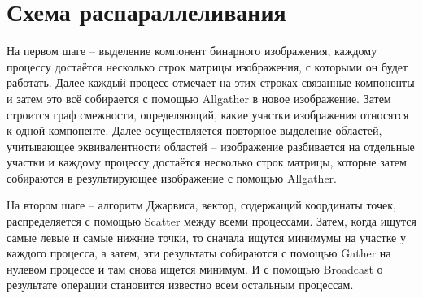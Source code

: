 \documentclass{report}
\begin{document}
\section*{Схема распараллеливания}
На первом шаге – выделение компонент бинарного изображения, каждому процессу достаётся несколько строк матрицы изображения, с которыми он будет работать. Далее каждый процесс отмечает на этих строках связанные компоненты и затем это всё собирается с помощью Allgather в новое изображение. Затем строится граф смежности, определяющий, какие участки изображения относятся к одной компоненте. Далее осуществляется повторное выделение областей, учитывающее эквивалентности областей – изображение разбивается на отдельные участки и каждому процессу достаётся несколько строк матрицы, которые затем собираются в результирующее изображение с помощью Allgather.
\par
На втором шаге – алгоритм Джарвиса, вектор, содержащий координаты точек, распределяется с помощью Scatter между всеми процессами. Затем, когда ищутся самые левые и самые нижние точки, то сначала ищутся минимумы на участке у каждого процесса, а затем, эти результаты собираются с помощью Gather на нулевом процессе и там снова ищется минимум. И с помощью Broadcast о результате операции становится известно всем остальным процессам.
\newpage

\end{document}
